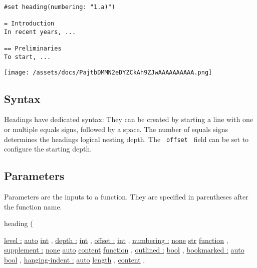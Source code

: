 \begin{verbatim}
#set heading(numbering: "1.a)")

= Introduction
In recent years, ...

== Preliminaries
To start, ...
\end{verbatim}

\texttt{[image: /assets/docs/PajtbDMMN2eDYZCkAh9ZJwAAAAAAAAAA.png]}

\subsection{Syntax}\label{syntax}

Headings have dedicated syntax: They can be created by starting a line
with one or multiple equals signs, followed by a space. The number of
equals signs determines the heading\textquotesingle s logical nesting
depth. The \texttt{\ offset\ } field can be set to configure the
starting depth.

\subsection{\texorpdfstring{{ Parameters
}}{ Parameters }}\label{parameters}

\label{parameters-tooltip}
Parameters are the inputs to a function. They are specified in
parentheses after the function name.

{ heading } (

{ \hyperref[parameters-level]{level :}
\href{/docs/reference/foundations/auto/}{auto}
\href{/docs/reference/foundations/int/}{int} , } {
\hyperref[parameters-depth]{depth :}
\href{/docs/reference/foundations/int/}{int} , } {
\hyperref[parameters-offset]{offset :}
\href{/docs/reference/foundations/int/}{int} , } {
\hyperref[parameters-numbering]{numbering :}
\href{/docs/reference/foundations/none/}{none}
\href{/docs/reference/foundations/str/}{str}
\href{/docs/reference/foundations/function/}{function} , } {
\hyperref[parameters-supplement]{supplement :}
\href{/docs/reference/foundations/none/}{none}
\href{/docs/reference/foundations/auto/}{auto}
\href{/docs/reference/foundations/content/}{content}
\href{/docs/reference/foundations/function/}{function} , } {
\hyperref[parameters-outlined]{outlined :}
\href{/docs/reference/foundations/bool/}{bool} , } {
\hyperref[parameters-bookmarked]{bookmarked :}
\href{/docs/reference/foundations/auto/}{auto}
\href{/docs/reference/foundations/bool/}{bool} , } {
\hyperref[parameters-hanging-indent]{hanging-indent :}
\href{/docs/reference/foundations/auto/}{auto}
\href{/docs/reference/layout/length/}{length} , } {
\href{/docs/reference/foundations/content/}{content} , }

